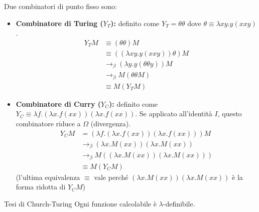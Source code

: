 Due combinatori di punto fisso sono:
\begin{itemize}
    \item \textbf{Combinatore di Turing ($Y_T$):} definito come $Y_T = \theta \theta$ dove $\theta \equiv \lambda x y. y(x x y)$.
\begin{align*}
Y_T M &\equiv (\theta \theta) M \\
&\equiv ((\lambda x y. y(x x y)) \theta) M \\
&\rightarrow_\beta (\lambda y. y(\theta \theta y)) M \\
&\rightarrow_\beta M (\theta \theta M) \\
&\equiv M (Y_T M)
\end{align*}

    \item \textbf{Combinatore di Curry ($Y_C$):} definito come $Y_C \equiv \lambda f. (\lambda x.f(xx))(\lambda x.f(xx))$. Se applicato all'identità $I$, questo combinatore riduce a $\Omega$ (divergenza).
    \begin{align*}
    Y_C M &= (\lambda f. (\lambda x. f(x x)) (\lambda x. f(x x))) M \\
    &\rightarrow_\beta (\lambda x. M(x x)) (\lambda x. M(x x)) \\
    &\rightarrow_\beta M ( (\lambda x. M(x x)) (\lambda x. M(x x)) ) \\
    &\equiv M (Y_C M)
    \end{align*}
    {\small \color{gray}(l'ultima equivalenza $\equiv$ vale perché $(\lambda x. M(x x)) (\lambda x. M(x x))$ è la forma ridotta di $Y_C M$)}

\end{itemize}

\begin{thmframe}{Tesi di Church-Turing}{}
 Ogni funzione calcolabile è $\lambda$-definibile.
\end{thmframe}

